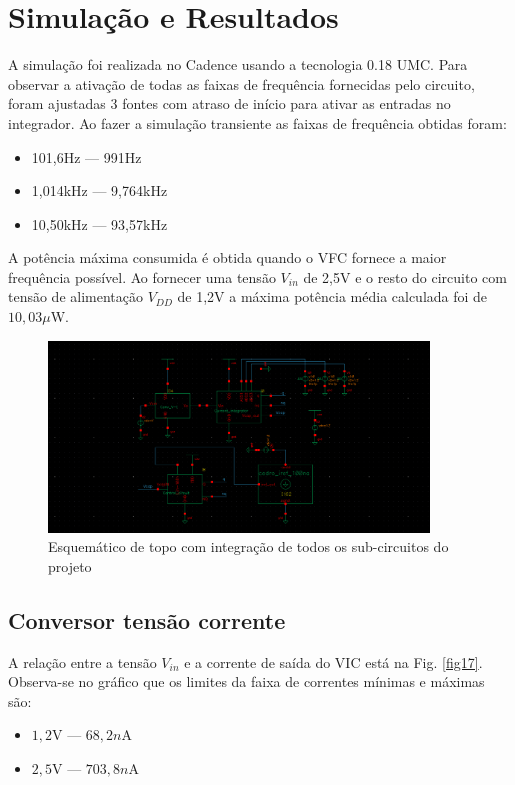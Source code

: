 \chapter[Simulação e Resultados]{Simulação e Resultados}

A simulação foi realizada no Cadence usando a tecnologia 0.18 UMC. Para observar a ativação de todas as faixas de frequência fornecidas pelo circuito, foram ajustadas 3 fontes com atraso de início para ativar as entradas no integrador. Ao fazer a simulação transiente as faixas de frequência obtidas foram:

\begin{itemize}
\item 101,6Hz	 \----	991Hz
\item 1,014kHz \----	9,764kHz
\item 10,50kHz \----	93,57kHz
\end{itemize}

A potência máxima consumida é obtida quando o VFC fornece a maior frequência possível. Ao fornecer uma tensão $V_{in}$ de 2,5V e o resto do circuito com tensão de alimentação $V_{DD}$ de 1,2V a máxima potência média calculada foi de $10,03\mu$W.


\begin{figure}[htb]
	\centering
	\includegraphics[width=0.9\textwidth]{figuras/top.png}
	\caption{ Esquemático de topo com integração de todos os sub-circuitos do projeto }
	\label{fig16}
\end{figure}

\section{Conversor tensão corrente}

A relação entre a tensão $V_{in}$ e a corrente de saída do VIC está na Fig. \ref{fig17}. Observa-se no gráfico que os limites da faixa de correntes mínimas e máximas são:
\begin{itemize}
\item $1,2$V	 \----	$68,2n$A
\item $2,5$V \----	$703,8n$A
\end{itemize}

